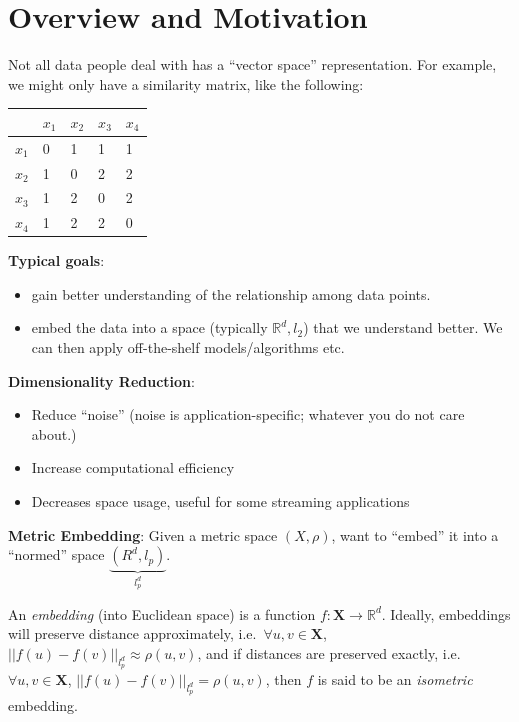 \section{Overview and Motivation}
Not all data people deal with has a ``vector space''
representation. For example, we might only have a similarity matrix,
like the following: 
\begin{center}
  \begin{tabular}{ | l | l | l | l | l |}
    \hline
    & $x_1$ & $x_2$ & $x_3$ & $x_4$\\
    \hline
    $x_1$ & 0 & 1 & 1 & 1 \\ \hline
    $x_2$ & 1 & 0 & 2 & 2 \\ \hline
    $x_3$ & 1 & 2 & 0 & 2 \\ \hline
    $x_4$ & 1 & 2 & 2 & 0 \\ \hline
    \hline
  \end{tabular}
\end{center}

\textbf{Typical goals}:
\begin{itemize}
\item gain better understanding of the relationship among data points.
\item embed the data into a space (typically $\mathbb{R}^d,l_2$) that
  we understand better. We can then apply off-the-shelf
  models/algorithms etc. 
\end{itemize}

\textbf{Dimensionality Reduction}:
\begin{itemize}
\item Reduce ``noise'' (noise is application-specific; whatever you do
  not care about.) 
\item Increase computational efficiency
\item Decreases space usage, useful for some streaming applications
\end{itemize}

\textbf{Metric Embedding}:
Given a metric space $(X,\rho)$, want to ``embed'' it into a
  ``normed'' space $\underbrace{(R^d,l_p)}_{l_p^d}$. 

\begin{definition}
    An \emph{embedding} (into Euclidean space) is a function $f:\mathbf{X}\rightarrow \mathbb{R}^d$.
    Ideally, embeddings will preserve distance approximately, i.e.\
    $\forall u,v \in \mathbf{X}$, $||f(u)-f(v)||_{l_p^d} \approx \rho(u,v)$,
    and if distances are preserved exactly, i.e.\
    $\forall u,v \in \mathbf{X}$, $||f(u)-f(v)||_{l_p^d} = \rho(u,v)$,
    then $f$ is said to be an \emph{isometric} embedding.
\end{definition}


